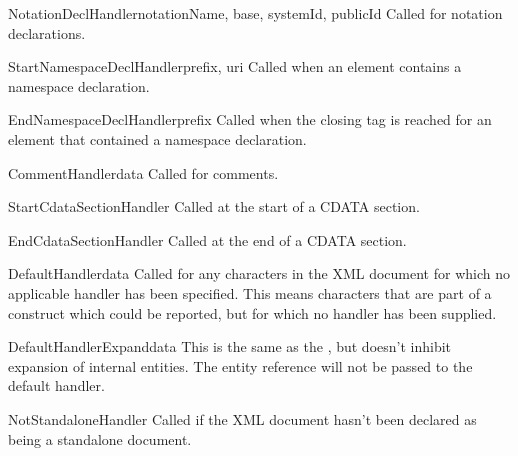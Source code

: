 \begin{methoddesc}[xmlparser]{NotationDeclHandler}{notationName, base,
                                                   systemId, publicId}
Called for notation declarations.
\end{methoddesc}

\begin{methoddesc}[xmlparser]{StartNamespaceDeclHandler}{prefix, uri}
Called when an element contains a namespace declaration.
\end{methoddesc}

\begin{methoddesc}[xmlparser]{EndNamespaceDeclHandler}{prefix}
Called when the closing tag is reached for an element 
that contained a namespace declaration.
\end{methoddesc}

\begin{methoddesc}[xmlparser]{CommentHandler}{data}
Called for comments.
\end{methoddesc}

\begin{methoddesc}[xmlparser]{StartCdataSectionHandler}{}
Called at the start of a CDATA section.
\end{methoddesc}

\begin{methoddesc}[xmlparser]{EndCdataSectionHandler}{}
Called at the end of a CDATA section.
\end{methoddesc}

\begin{methoddesc}[xmlparser]{DefaultHandler}{data}
Called for any characters in the XML document for
which no applicable handler has been specified.  This means
characters that are part of a construct which could be reported, but
for which no handler has been supplied. 
\end{methoddesc}

\begin{methoddesc}[xmlparser]{DefaultHandlerExpand}{data}
This is the same as the , 
but doesn't inhibit expansion of internal entities.
The entity reference will not be passed to the default handler.
\end{methoddesc}

\begin{methoddesc}[xmlparser]{NotStandaloneHandler}{}
Called if the XML document hasn't been declared as being a standalone
document.
\end{methoddesc}

